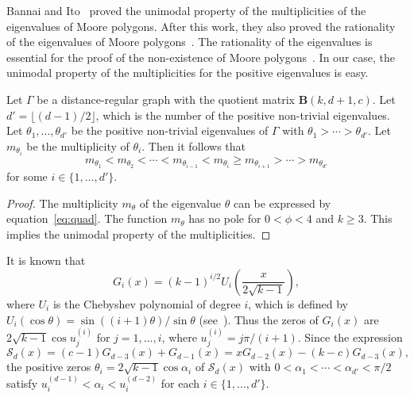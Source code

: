 \documentclass[ALCO,ThmDefs,Unicode,epreuves]{cedram}
\begin{document}
Bannai and Ito~\cite{BI79} proved the unimodal property of the multiplicities of the eigenvalues of 
Moore polygons. After this work, they also proved the rationality of the eigenvalues of Moore polygons~\cite{BI81}. 
The rationality of the eigenvalues is essential for the proof of the non-existence of Moore polygons~\cite{DG81}. 
In our case, the unimodal property of the multiplicities for the positive eigenvalues is easy. 
\begin{lemm} \label{lem:unimodal}
Let $\Gamma$ be a distance-regular graph with the quotient matrix $\boldsymbol{B} (k,d+1,c)$. Let $d'=\lfloor (d-1)/2 \rfloor$, which is the number of the positive non-trivial eigenvalues. 
Let $\theta_1, \ldots, \theta_{d'}$ be the positive non-trivial eigenvalues of $\Gamma$ with $\theta_1>\cdots > \theta_{d'}$. 
Let $m_{\theta_i}$ be the multiplicity of $\theta_i$. 
Then it follows that 
\[
m_{\theta_1} < m_{\theta_2} < \cdots < m_{\theta_{i-1}}< m_{\theta_i} \geq m_{\theta_{i+1}}>\cdots > m_{\theta_{d'}} \]
 for some $i \in \{1,\ldots, d'\}$. 
\end{lemm} 
\begin{proof}
The multiplicity $m_\theta$ of the eigenvalue $\theta$ can be expressed by equation~\eqref{eq:quad}. 
The function $m_\theta$ has no pole for $0< \phi < 4$ and $k\geq 3$. 
This implies the unimodal property of the multiplicities. 
\end{proof}

It is known that 
\[
G_i(x)= (k-1)^{i/2} U_i \left(\frac{x}{2 \sqrt{k-1}}\right), 
\]
where $U_i$ is the Chebyshev polynomial of degree $i$, which is defined by 
$U_i(\cos \theta)=\sin((i+1)\theta)/ \sin \theta$ (see~\cite{DSVb}). 
Thus the zeros of $G_i(x)$ are $2 \sqrt{k-1} \cos u_j^{(i)}$ for $j=1,\ldots, i$, where
$u_{j}^{(i)}=j \pi/(i+1)$. 
Since the expression 
\[
\mathscr{S}_{d}(x)=(c-1)G_{d-3}(x)+G_{d-1}(x)
=x G_{d-2}(x)-(k-c) G_{d-3}(x), 
\]
the positive zeros $\theta_{i}=2\sqrt{k-1} \cos \alpha_i$ of $\mathscr{S}_{d}(x)$ with $0<\alpha_1<\cdots < \alpha_{d'}< \pi /2$ 
satisfy 
$%
u^{(d-1)}_{i}<\alpha_i< 
u^{(d-2)}_{i}$ for each $i \in \{1,\ldots, d'\}$. 
\end{document}
